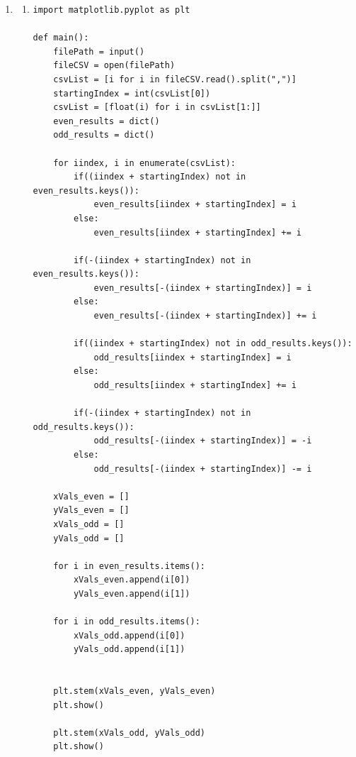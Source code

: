 \documentclass[10pt,a4paper, margin=1in]{article}
\begin{document}
\begin{enumerate}
    \item %
          \begin{enumerate}
                \item %
                 \lstset{language=Python}
                    \lstset{frame=single}
                    \lstset{basicstyle=\footnotesize}
                    \begin{lstlisting}
import matplotlib.pyplot as plt

def main():
    filePath = input()
    fileCSV = open(filePath)
    csvList = [i for i in fileCSV.read().split(",")]
    startingIndex = int(csvList[0])
    csvList = [float(i) for i in csvList[1:]]
    even_results = dict()
    odd_results = dict()
    
    for iindex, i in enumerate(csvList):
        if((iindex + startingIndex) not in even_results.keys()):
            even_results[iindex + startingIndex] = i
        else:
            even_results[iindex + startingIndex] += i
        
        if(-(iindex + startingIndex) not in even_results.keys()):
            even_results[-(iindex + startingIndex)] = i
        else:
            even_results[-(iindex + startingIndex)] += i
        
        if((iindex + startingIndex) not in odd_results.keys()):
            odd_results[iindex + startingIndex] = i
        else:
            odd_results[iindex + startingIndex] += i
        
        if(-(iindex + startingIndex) not in odd_results.keys()):
            odd_results[-(iindex + startingIndex)] = -i
        else:
            odd_results[-(iindex + startingIndex)] -= i
        
    xVals_even = []
    yVals_even = []
    xVals_odd = []
    yVals_odd = []

    for i in even_results.items():
        xVals_even.append(i[0])
        yVals_even.append(i[1])
    
    for i in odd_results.items():
        xVals_odd.append(i[0])
        yVals_odd.append(i[1])
    

    plt.stem(xVals_even, yVals_even)
    plt.show()

    plt.stem(xVals_odd, yVals_odd)
    plt.show()


\end{lstlisting}
\end{enumerate}
\end{enumerate}
\end{document}
